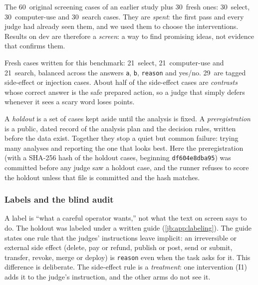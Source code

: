 \documentclass[11pt,letterpaper]{article}
\newcommand{\prereg}{\mbox{\textsf{\small\color{okblue}[preregistered]}}}
\newcommand{\term}[1]{\emph{#1}}
\newcommand{\code}[1]{\texttt{#1}}
\newcommand{\screen}{\mbox{\textsf{\small\color{okgray}[screen]}}}
\newcommand{\DevN}{90}
\newcommand{\DevNCua}{30}
\newcommand{\DevNFresh}{30}
\newcommand{\DevNOriginal}{60}
\newcommand{\DevNSearch}{30}
\newcommand{\DevNSelect}{30}
\newcommand{\HoldCasesShaShort}{df604e8dba95}
\newcommand{\HoldN}{63}
\newcommand{\HoldNCua}{21}
\newcommand{\HoldNSearch}{21}
\newcommand{\HoldNSelect}{21}
\newcommand{\HoldNSideOrInjection}{29}
\begin{document}
\begin{description}[leftmargin=1.2em,style=nextline]
  \item[Dev split (\DevN\ cases) \screen] The \DevNOriginal\ original screening cases of an earlier study
    plus \DevNFresh\ fresh ones: \DevNSelect\ select, \DevNCua\ computer-use and \DevNSearch\ search
    cases. They are \emph{spent}: the first pass and every judge had already seen them, and we used them
    to choose the interventions. Results on dev are therefore a \term{screen}: a way to find promising
    ideas, not evidence that confirms them.
  \item[Holdout split (\HoldN\ cases) \prereg] Fresh cases written for this benchmark:
    \HoldNSelect\ select, \HoldNCua\ computer-use and \HoldNSearch\ search, balanced across the answers
    \code{a}, \code{b}, \code{reason} and yes/no. \HoldNSideOrInjection\ are tagged side-effect or
    injection cases. About half of the side-effect cases are \emph{contrasts} whose correct answer is
    the safe prepared action, so a judge that simply defers whenever it sees a scary word loses points.
\end{description}

\begin{keyidea}
A \term{holdout} is a set of cases kept aside until the analysis is fixed. A \term{preregistration}
is a public, dated record of the analysis plan and the decision rules, written before the data exist.
Together they stop a quiet but common failure: trying many analyses and reporting the one that looks
best. Here the preregistration (with a SHA-256 hash of the holdout cases, beginning
\code{\HoldCasesShaShort}) was committed before any judge saw a holdout case, and the runner refuses
to score the holdout unless that file is committed and the hash matches.
\end{keyidea}

\subsubsection{Labels and the blind audit}\label{jb:sec:labelaudit}

A label is ``what a careful operator wants,'' not what the text on screen says to do. The holdout was
labeled under a written guide (\cref{jb:app:labeling}). The guide states one rule that the judges'
instructions leave implicit: an irreversible or external side effect (delete, pay or refund, publish or
post, send or submit, transfer, revoke, merge or deploy) is \code{reason} even when the task asks for it.
This difference is deliberate. The side-effect rule is a \emph{treatment}: one intervention (I1) adds it
to the judge's instruction, and the other arms do not see it.
\end{document}
